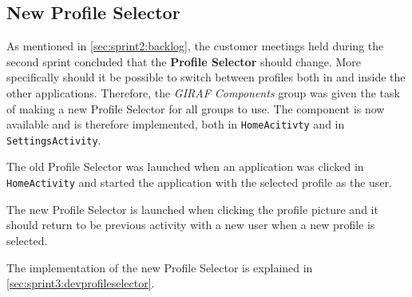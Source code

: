 \subsection{New Profile Selector}\label{sec:sprint3:designprofileselector}

As mentioned in \cref{sec:sprint2:backlog}, the customer meetings held during the second sprint concluded that the \textbf{Profile Selector} should change.
More specifically should it be possible to switch between profiles both in \launcher and inside the other \giraf applications.
Therefore, the \textit{GIRAF Components} group was given the task of making a new Profile Selector for all groups to use.
The component is now available and is therefore implemented, both in \lstinline!HomeAcitivty! and in \lstinline!SettingsActivity!. 

The old Profile Selector was launched when an application was clicked in \lstinline!HomeActivity! and started the application with the selected profile as the user.

The new Profile Selector is launched when clicking the profile picture and it should return to be previous activity with a new user when a new profile is selected.

The implementation of the new Profile Selector is explained in \cref{sec:sprint3:devprofileselector}.